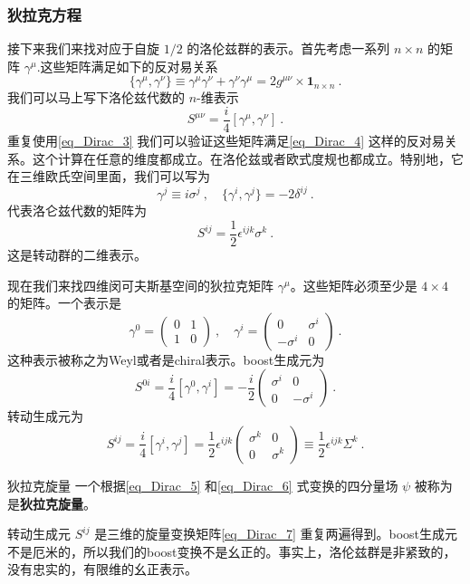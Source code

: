 \subsubsection{狄拉克方程}
接下来我们来找对应于自旋 $1/2$ 的洛伦兹群的表示。首先考虑一系列 $n\times n$ 的矩阵 $\gamma^\mu$.这些矩阵满足如下的反对易关系
\begin{equation}\label{eq_Dirac_3}
\{\gamma^\mu,\gamma^\nu\}\equiv\gamma^\mu\gamma^\nu+\gamma^\nu\gamma^\mu = 2 g^{\mu\nu} \times \boldsymbol{1}_{n\times n}~.
\end{equation}
我们可以马上写下洛伦兹代数的 $n$-维表示
\begin{equation}
S^{\mu\nu} = \frac{i}{4}[\gamma^\mu,\gamma^\nu]~.
\end{equation}
重复使用\autoref{eq_Dirac_3} 我们可以验证这些矩阵满足\autoref{eq_Dirac_4} 这样的反对易关系。这个计算在任意的维度都成立。在洛伦兹或者欧式度规也都成立。特别地，它在三维欧氏空间里面，我们可以写为
\begin{equation}
\gamma^j \equiv i \sigma^j~,\quad \{\gamma^i,\gamma^j\} = - 2 \delta^{ij} ~.
\end{equation}
代表洛仑兹代数的矩阵为
\begin{equation}\label{eq_Dirac_7}
S^{ij} = \frac{1}{2} \epsilon^{ijk} \sigma^k~.
\end{equation}
这是转动群的二维表示。

现在我们来找四维闵可夫斯基空间的狄拉克矩阵 $\gamma^\mu$。这些矩阵必须至少是 $4\times 4$ 的矩阵。一个表示是
\begin{equation}\label{eq_Dirac_9}
\gamma^0 = \begin{pmatrix}
0 & 1 \\ 1 & 0
\end{pmatrix}~,\quad \gamma^i = \begin{pmatrix}
0 & \sigma^i \\
-\sigma^i & 0 
\end{pmatrix}~.
\end{equation}
这种表示被称之为Weyl或者是chiral表示。boost生成元为
\begin{equation}\label{eq_Dirac_5}
S^{0i} = \frac{i}{4}[\gamma^0,\gamma^i]=-\frac{i}{2}\begin{pmatrix}
\sigma^i & 0 \\
0 & -\sigma^i 
\end{pmatrix}~.
\end{equation}
转动生成元为
\begin{equation}\label{eq_Dirac_6}
S^{ij} = \frac{i}{4}[\gamma^i,\gamma^j] = \frac{1}{2} \epsilon^{ijk} \begin{pmatrix}
\sigma^k & 0 \\ 
0 & \sigma^k 
\end{pmatrix}\equiv \frac{1}{2} \epsilon^{ijk} \Sigma^k~.
\end{equation}
\begin{definition}{狄拉克旋量}
一个根据\autoref{eq_Dirac_5} 和\autoref{eq_Dirac_6} 
式变换的四分量场 $\psi$ 被称为是\textbf{狄拉克旋量}。
\end{definition}
转动生成元 $S^{ij}$ 是三维的旋量变换矩阵\autoref{eq_Dirac_7} 重复两遍得到。boost生成元不是厄米的，所以我们的boost变换不是幺正的。事实上，洛伦兹群是非紧致的，没有忠实的，有限维的幺正表示。

